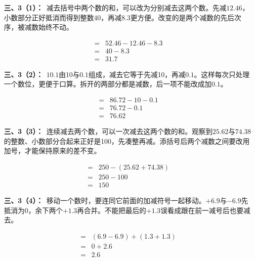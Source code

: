 \documentclass[multi=snippet,border=0pt]{standalone}
\newenvironment{snippet}[3]{\begin{minipage}{#1bp}\color{answerred}\fontsize{#2}{#3}\selectfont\raggedright}{\end{minipage}}
\begin{document}
\begin{snippet}{505}{11.5}{14}\textbf{三、3（1）：}\ 减去括号中两个数的和，可以改为分别减去这两个数。先减\(12.46\)，小数部分正好抵消而得到整数40，再减\(8.3\)更方便。改变的是两个减数的先后次序，被减数始终不动。\end{snippet}
\begin{snippet}{195.00000000000003}{10.5}{12.8}\[\begin{aligned}={}&52.46-12.46-8.3\\={}&40-8.3\\={}&31.7\end{aligned}\]\end{snippet}
\begin{snippet}{505}{11.5}{14}\textbf{三、3（2）：}\ \(10.1\)由10与\(0.1\)组成，减去它等于先减10，再减\(0.1\)。这样每次只处理一个数位，更便于口算。拆开的两部分都是减数，后一项不能改成加\(0.1\)。\end{snippet}
\begin{snippet}{217.0}{10.5}{12.8}\[\begin{aligned}={}&86.72-10-0.1\\={}&76.72-0.1\\={}&76.62\end{aligned}\]\end{snippet}
\begin{snippet}{505}{11.5}{14}\textbf{三、3（3）：}\ 连续减去两个数，可以一次减去这两个数的和。观察到\(25.62\)与\(74.38\)的整数、小数部分合起来正好是100，先凑整再减。添括号后两个减数之间要改用加号，才能保持原来的差不变。\end{snippet}
\begin{snippet}{196.00000000000003}{10.5}{12.8}\[\begin{aligned}={}&250-(25.62+74.38)\\={}&250-100\\={}&150\end{aligned}\]\end{snippet}
\begin{snippet}{505}{11.5}{14}\textbf{三、3（4）：}\ 移动一个数时，要连同它前面的加减符号一起移动。\(+6.9\)与\(-6.9\)先抵消为0，余下两个\(+1.3\)再合并。不能把最后的\(+1.3\)误看成跟在前一减号后也要减去。\end{snippet}
\begin{snippet}{232.0}{10.5}{12.8}\[\begin{aligned}={}&(6.9-6.9)+(1.3+1.3)\\={}&0+2.6\\={}&2.6\end{aligned}\]\end{snippet}
\end{document}
